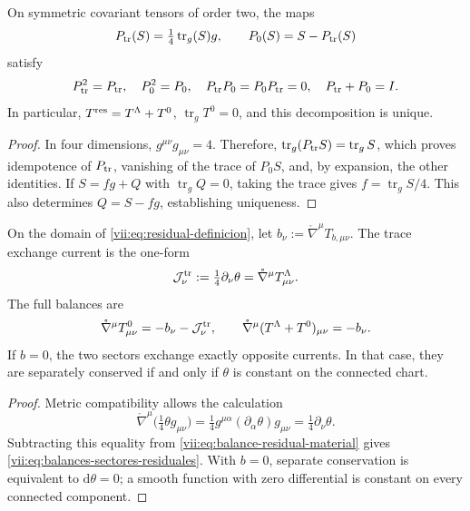 \begin{proposition}
\label{vii:prop:proyectores-traza-residual}
On symmetric covariant tensors of order two, the maps
\[
 P_{\rm tr}(S)=\tfrac14\operatorname{tr}_g(S)g,
 \qquad P_0(S)=S-P_{\rm tr}(S)
\]
satisfy
\begin{equation}
 P_{\rm tr}^2=P_{\rm tr},\quad P_0^2=P_0,\quad
 P_{\rm tr}P_0=P_0P_{\rm tr}=0,\quad P_{\rm tr}+P_0=I.
 \label{vii:eq:proyectores-traza-residual}
\end{equation}
In particular, \(T^{\rm res}=T^\Lambda+T^0\),
\(\operatorname{tr}_gT^0=0\), and this decomposition is unique.
\end{proposition}
\begin{proof}
In four dimensions, \(g^{\mu\nu}g_{\mu\nu}=4\). Therefore,
\(\operatorname{tr}_g(P_{\rm tr}S)=\operatorname{tr}_gS\),
which proves idempotence of \(P_{\rm tr}\), vanishing of the
trace of \(P_0S\), and, by expansion, the other identities.
If \(S=fg+Q\) with \(\operatorname{tr}_gQ=0\), taking the
trace gives \(f=\operatorname{tr}_gS/4\). This also determines
\(Q=S-fg\), establishing uniqueness.
\end{proof}

\begin{theorem}
\label{vii:thm:intercambio-traza-residual}
On the domain of \eqref{vii:eq:residual-definicion}, let
\(b_\nu:=\mathring\nabla^\mu T_{b,\mu\nu}\). The trace
exchange current is the one-form
\begin{equation}
 \mathcal J^{\rm tr}_\nu
 :=\tfrac14\partial_\nu\theta
 =\mathring\nabla^\mu T^\Lambda_{\mu\nu}.
 \label{vii:eq:corriente-intercambio-traza}
\end{equation}
The full balances are
\begin{equation}
 \mathring\nabla^\mu T^0_{\mu\nu}
       =-b_\nu-\mathcal J^{\rm tr}_\nu,
 \qquad
 \mathring\nabla^\mu(T^\Lambda+T^0)_{\mu\nu}=-b_\nu.
 \label{vii:eq:balances-sectores-residuales}
\end{equation}
If \(b=0\), the two sectors exchange exactly opposite currents.
In that case, they are separately conserved if and only if \(\theta\)
is constant on the connected chart.
\end{theorem}
\begin{proof}
Metric compatibility allows the calculation
\[
 \mathring\nabla^\mu\bigl(\tfrac14\theta g_{\mu\nu}\bigr)
 =\tfrac14g^{\mu\alpha}(\partial_\alpha\theta)g_{\mu\nu}
 =\tfrac14\partial_\nu\theta.
\]
Subtracting this equality from \eqref{vii:eq:balance-residual-material}
gives \eqref{vii:eq:balances-sectores-residuales}. With \(b=0\),
separate conservation is equivalent to \(\mathrm d\theta=0\);
a smooth function with zero differential is constant on every
connected component.
\end{proof}

